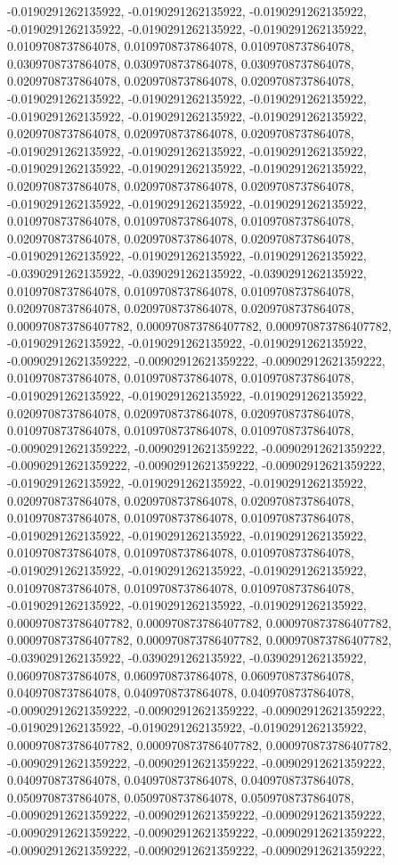 \documentclass[
  ,man]{apa6}
\begin{document}
-0.0190291262135922, -0.0190291262135922, -0.0190291262135922, -0.0190291262135922, -0.0190291262135922, -0.0190291262135922, 0.0109708737864078, 0.0109708737864078, 0.0109708737864078, 0.0309708737864078, 0.0309708737864078, 0.0309708737864078, 0.0209708737864078, 0.0209708737864078, 0.0209708737864078, -0.0190291262135922, -0.0190291262135922, -0.0190291262135922, -0.0190291262135922, -0.0190291262135922, -0.0190291262135922, 0.0209708737864078, 0.0209708737864078, 0.0209708737864078, -0.0190291262135922,
-0.0190291262135922, -0.0190291262135922, -0.0190291262135922, -0.0190291262135922, -0.0190291262135922, 0.0209708737864078, 0.0209708737864078, 0.0209708737864078, -0.0190291262135922, -0.0190291262135922, -0.0190291262135922, 0.0109708737864078, 0.0109708737864078, 0.0109708737864078, 0.0209708737864078, 0.0209708737864078, 0.0209708737864078, -0.0190291262135922, -0.0190291262135922, -0.0190291262135922, -0.0390291262135922, -0.0390291262135922, -0.0390291262135922, 0.0109708737864078, 0.0109708737864078,
0.0109708737864078, 0.0209708737864078, 0.0209708737864078, 0.0209708737864078, 0.000970873786407782, 0.000970873786407782, 0.000970873786407782, -0.0190291262135922, -0.0190291262135922, -0.0190291262135922, -0.00902912621359222, -0.00902912621359222, -0.00902912621359222, 0.0109708737864078, 0.0109708737864078, 0.0109708737864078, -0.0190291262135922, -0.0190291262135922, -0.0190291262135922, 0.0209708737864078, 0.0209708737864078, 0.0209708737864078, 0.0109708737864078, 0.0109708737864078, 0.0109708737864078,
-0.00902912621359222, -0.00902912621359222, -0.00902912621359222, -0.00902912621359222, -0.00902912621359222, -0.00902912621359222, -0.0190291262135922, -0.0190291262135922, -0.0190291262135922, 0.0209708737864078, 0.0209708737864078, 0.0209708737864078, 0.0109708737864078, 0.0109708737864078, 0.0109708737864078, -0.0190291262135922, -0.0190291262135922, -0.0190291262135922, 0.0109708737864078, 0.0109708737864078, 0.0109708737864078, -0.0190291262135922, -0.0190291262135922, -0.0190291262135922,
0.0109708737864078, 0.0109708737864078, 0.0109708737864078, -0.0190291262135922, -0.0190291262135922, -0.0190291262135922, 0.000970873786407782, 0.000970873786407782, 0.000970873786407782, 0.000970873786407782, 0.000970873786407782, 0.000970873786407782, -0.0390291262135922, -0.0390291262135922, -0.0390291262135922, 0.0609708737864078, 0.0609708737864078, 0.0609708737864078, 0.0409708737864078, 0.0409708737864078, 0.0409708737864078, -0.00902912621359222, -0.00902912621359222, -0.00902912621359222,
-0.0190291262135922, -0.0190291262135922, -0.0190291262135922, 0.000970873786407782, 0.000970873786407782, 0.000970873786407782, -0.00902912621359222, -0.00902912621359222, -0.00902912621359222, 0.0409708737864078, 0.0409708737864078, 0.0409708737864078, 0.0509708737864078, 0.0509708737864078, 0.0509708737864078, -0.00902912621359222, -0.00902912621359222, -0.00902912621359222, -0.00902912621359222, -0.00902912621359222, -0.00902912621359222, -0.00902912621359222, -0.00902912621359222, -0.00902912621359222,
\end{document}

